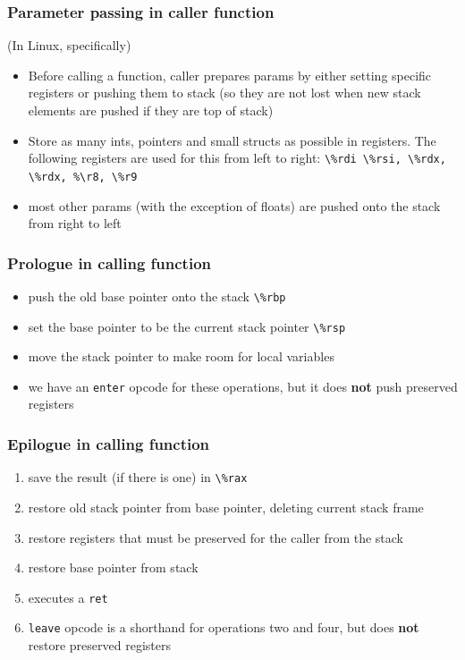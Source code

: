 \documentclass{article}
\begin{document}
\subsubsection{Parameter passing in caller function}
(In Linux, specifically)
\begin{itemize}
    \item Before calling a function, caller prepares params by either setting specific registers or pushing them to stack (so they are not lost when new stack elements are pushed if they are top of stack)
    \item Store as many ints, pointers and small structs as possible in registers. The following registers are used for this from left to right: \verb|\%rdi \%rsi, \%rdx, \%rdx, %\r8, \%r9|
    \item most other params (with the exception of floats) are pushed onto the stack from right to left
\end{itemize}
\subsubsection{Prologue in calling function}
\begin{itemize}
    \item push the old base pointer onto the stack \verb|\%rbp|
    \item set the base pointer to be the current stack pointer \verb|\%rsp|
    \item move the stack pointer to make room for local variables
    \item we have an \verb|enter| opcode for these operations, but it does \textbf{not} push preserved registers
\end{itemize}
\subsubsection{Epilogue in calling function}
\begin{enumerate}
    \item save the result (if there is one) in \verb|\%rax|
    \item restore old stack pointer from base pointer, deleting current stack frame
    \item restore registers that must be preserved for the caller from the stack
    \item restore base pointer from stack
    \item executes a \verb|ret|
    \item \verb|leave| opcode is a shorthand for operations two and four, but does \textbf{not} restore preserved registers
\end{enumerate}
\end{document}
